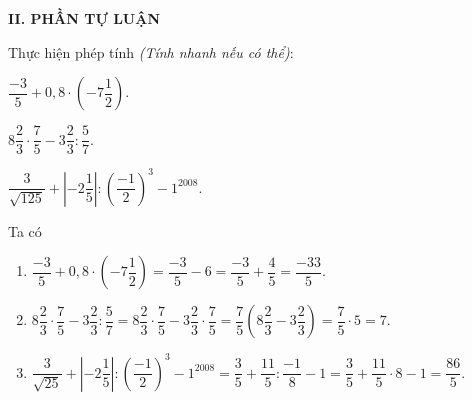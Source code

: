 	\noindent\textbf{II. PHẦN TỰ LUẬN}
	\setcounter{ex}{0}
	\begin{ex}%
			Thực hiện phép tính \textit{(Tính nhanh nếu có thể)}:
			\begin{listEX}[2]
			\item $\dfrac{-3}{5}+0{,}8 \cdot \left(-7\dfrac{1}{2}\right).$
			\item $8 \dfrac{2}{3} \cdot \dfrac{7}{5} - 3\dfrac{2}{3}: \dfrac{5}{7}.$
			\item $\dfrac{3}{\sqrt{125}} + \left|-2\dfrac{1}{5}\right| : \left(\dfrac{-1}{2}\right)^3 - 1^{2008}.$
		\end{listEX}
			\loigiai
			{
				Ta có
				\begin{enumerate}
					\item  $\dfrac{-3}{5}+0{,}8 \cdot \left(-7\dfrac{1}{2}\right) = \dfrac{-3}{5}-6 = \dfrac{-3}{5}+\dfrac{4}{5}=\dfrac{-33}{5}.$
					\item  $8 \dfrac{2}{3} \cdot \dfrac{7}{5} - 3\dfrac{2}{3}: \dfrac{5}{7}
						= 8\dfrac{2}{3} \cdot \dfrac{7}{5}-3\dfrac{2}{3} \cdot \dfrac{7}{5}
						=\dfrac{7}{5}\left(8\dfrac{2}{3}-3\dfrac{2}{3}\right)
						=\dfrac{7}{5} \cdot 5=7.$
					\item  $\dfrac{3}{\sqrt{25}} + \left|-2\dfrac{1}{5}\right| : \left(\dfrac{-1}{2}\right)^3 - 1^{2008}
					=\dfrac{3}{5}+\dfrac{11}{5}:\dfrac{-1}{8}-1
					=\dfrac{3}{5}+\dfrac{11}{5} \cdot 8-1=\dfrac{86}{5}.$
			\end{enumerate}
		}
		\end{ex}
%		
